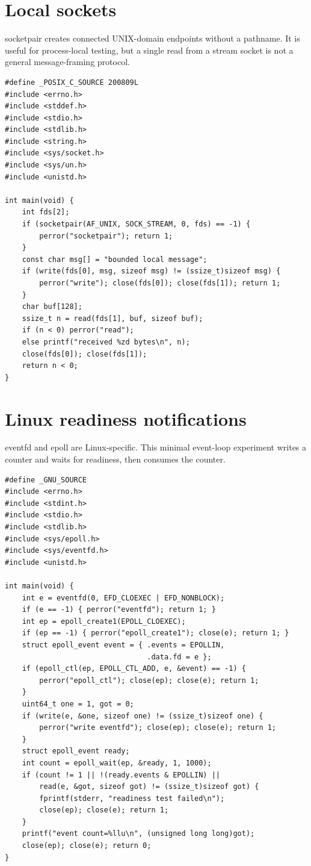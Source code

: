 \documentclass[11pt,letterpaper,oneside]{report}
\begin{document}
\chapter{Local sockets}
socketpair creates connected UNIX-domain endpoints without a pathname. It is useful for process-local testing, but a single read from a stream socket is not a general message-framing protocol.

\begin{lstlisting}
#define _POSIX_C_SOURCE 200809L
#include <errno.h>
#include <stddef.h>
#include <stdio.h>
#include <stdlib.h>
#include <string.h>
#include <sys/socket.h>
#include <sys/un.h>
#include <unistd.h>

int main(void) {
    int fds[2];
    if (socketpair(AF_UNIX, SOCK_STREAM, 0, fds) == -1) {
        perror("socketpair"); return 1;
    }
    const char msg[] = "bounded local message";
    if (write(fds[0], msg, sizeof msg) != (ssize_t)sizeof msg) {
        perror("write"); close(fds[0]); close(fds[1]); return 1;
    }
    char buf[128];
    ssize_t n = read(fds[1], buf, sizeof buf);
    if (n < 0) perror("read");
    else printf("received %zd bytes\n", n);
    close(fds[0]); close(fds[1]);
    return n < 0;
}
\end{lstlisting}
\chapter{Linux readiness notifications}
eventfd and epoll are Linux-specific. This minimal event-loop experiment writes a counter and waits for readiness, then consumes the counter.

\begin{lstlisting}
#define _GNU_SOURCE
#include <errno.h>
#include <stdint.h>
#include <stdio.h>
#include <stdlib.h>
#include <sys/epoll.h>
#include <sys/eventfd.h>
#include <unistd.h>

int main(void) {
    int e = eventfd(0, EFD_CLOEXEC | EFD_NONBLOCK);
    if (e == -1) { perror("eventfd"); return 1; }
    int ep = epoll_create1(EPOLL_CLOEXEC);
    if (ep == -1) { perror("epoll_create1"); close(e); return 1; }
    struct epoll_event event = { .events = EPOLLIN,
                                 .data.fd = e };
    if (epoll_ctl(ep, EPOLL_CTL_ADD, e, &event) == -1) {
        perror("epoll_ctl"); close(ep); close(e); return 1;
    }
    uint64_t one = 1, got = 0;
    if (write(e, &one, sizeof one) != (ssize_t)sizeof one) {
        perror("write eventfd"); close(ep); close(e); return 1;
    }
    struct epoll_event ready;
    int count = epoll_wait(ep, &ready, 1, 1000);
    if (count != 1 || !(ready.events & EPOLLIN) ||
        read(e, &got, sizeof got) != (ssize_t)sizeof got) {
        fprintf(stderr, "readiness test failed\n");
        close(ep); close(e); return 1;
    }
    printf("event count=%llu\n", (unsigned long long)got);
    close(ep); close(e); return 0;
}
\end{lstlisting}
\end{document}
